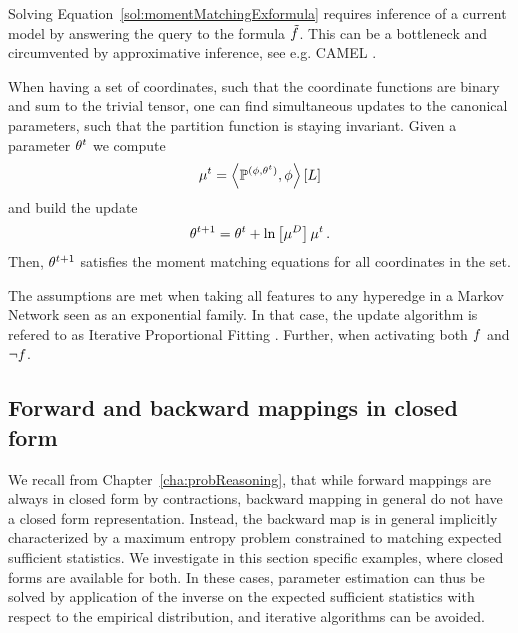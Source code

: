 Solving Equation~\ref{sol:momentMatchingExformula} requires inference of a current model by answering the query to the formula $\tilde{f}$.
This can be a bottleneck and circumvented by approximative inference, see e.g. CAMEL \cite{ganapathi_constrained_2008}.



\begin{remark}
	When having a set of coordinates, such that the coordinate functions are binary and sum to the trivial tensor, one can find simultaneous updates to the canonical parameters, such that the partition function is staying invariant.
	Given a parameter $\theta^t$ we compute
		\[ \mu^t = \left\langle \mathbb{P}^{(\phi,\theta^t)}, \phi\right\rangle \left[ L \right] \]
	and build the update
		\[ \theta^{t+1} = \theta^t + \ln \left[ \mu^{D} \right]{\mu^t} \, . \]
	Then, $\theta^{t+1}$ satisfies the moment matching equations for all coordinates in the set.
	
	
	The assumptions are met when taking all features to any hyperedge in a Markov Network seen as an exponential family.
	In that case, the update algorithm is refered to as  Iterative Proportional Fitting \cite{wainwright_graphical_2008}.
	Further, when activating both $f$ and $\lnot f$.
\end{remark}


\subsection{Forward and backward mappings in closed form}

We recall from Chapter~\ref{cha:probReasoning}, that while forward mappings are always in closed form by contractions, backward mapping in general do not have a closed form representation.
Instead, the backward map is in general implicitly characterized by a maximum entropy problem constrained to matching expected sufficient statistics.
We investigate in this section specific examples, where closed forms are available for both.
In these cases, parameter estimation can thus be solved by application of the inverse on the expected sufficient statistics with respect to the empirical distribution, and iterative algorithms can be avoided.


